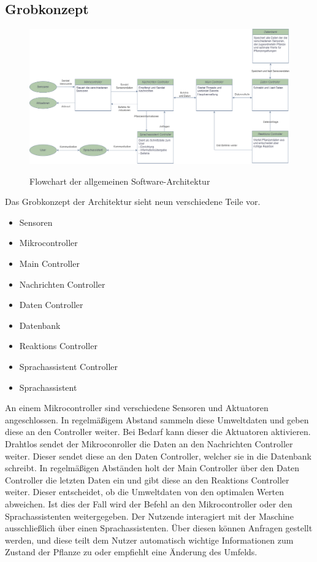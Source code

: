 \subsection{Grobkonzept}

\begin{figure}[H]
\centering
\includegraphics[width=\textwidth]{images/Grobkonzept_Flow.png}
\caption{Flowchart der allgemeinen Software-Architektur}\cite{rainpoint_smart_timer}
\label{fig:grob_flow}
\end{figure}

Das Grobkonzept der Architektur sieht neun verschiedene Teile vor. 

\begin{itemize}
    \item Sensoren
    \item Mikrocontroller
    \item Main Controller
    \item Nachrichten Controller
    \item Daten Controller
    \item Datenbank
    \item Reaktions Controller
    \item Sprachassistent Controller
    \item Sprachassistent
\end{itemize}

An einem Mikrocontroller sind verschiedene Sensoren und Aktuatoren angeschlossen. In regelmäßigem Abstand sammeln diese Umweltdaten und geben diese an den Controller weiter. Bei Bedarf kann dieser die Aktuatoren aktivieren. 
Drahtlos sendet der Mikroconroller die Daten an den Nachrichten Controller weiter. Dieser sendet diese an den Daten Controller, welcher sie in die Datenbank schreibt. 
In regelmäßigen Abständen holt der Main Controller über den Daten Controller die letzten Daten ein und gibt diese an den Reaktions Controller weiter. Dieser entscheidet, ob die Umweltdaten von den optimalen Werten abweichen. Ist dies der Fall wird der Befehl an den Mikrocontroller oder den Sprachassistenten weitergegeben. 
Der Nutzende interagiert mit der Maschine ausschließlich über einen Sprachassistenten. Über diesen können Anfragen gestellt werden, und diese teilt dem Nutzer automatisch wichtige Informationen zum Zustand der Pflanze zu oder empfiehlt eine Änderung des Umfelds.

